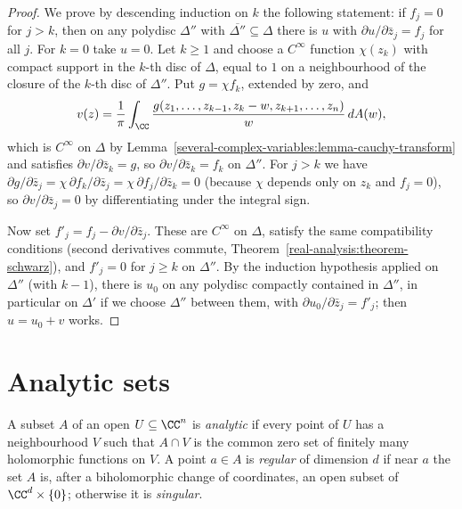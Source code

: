 \begin{proof}
We prove by descending induction on $k$ the following statement: if $f_j = 0$ for $j > k$, then on any polydisc $\Delta''$ with $\overline{\Delta''} \subseteq \Delta$ there is $u$ with
$\partial u/\partial\bar z_j = f_j$ for all $j$. For $k = 0$ take $u = 0$. Let $k \geq 1$ and choose a $C^\infty$ function $\chi(z_k)$ with compact support in the $k$-th disc of $\Delta$, equal to $1$ on a
neighbourhood of the closure of the $k$-th disc of $\Delta''$. Put $g = \chi f_k$, extended by zero, and
\[
v(z) = \frac1\pi\int_\CC\frac{g(z_1, \ldots, z_{k-1}, z_k - w, z_{k+1}, \ldots, z_n)}{w}\,dA(w),
\]
which is $C^\infty$ on $\Delta$ by Lemma~\ref{several-complex-variables:lemma-cauchy-transform} and satisfies $\partial v/\partial\bar z_k = g$, so $\partial v/\partial\bar z_k = f_k$ on $\Delta''$. For
$j > k$ we have $\partial g/\partial\bar z_j = \chi\,\partial f_k/\partial\bar z_j = \chi\,\partial f_j/\partial\bar z_k = 0$ (because $\chi$ depends only on $z_k$ and $f_j = 0$), so
$\partial v/\partial\bar z_j = 0$ by differentiating under the integral sign.

Now set $f'_j = f_j - \partial v/\partial\bar z_j$. These are $C^\infty$ on $\Delta$, satisfy the same compatibility conditions (second derivatives commute,
Theorem~\ref{real-analysis:theorem-schwarz}), and $f'_j = 0$ for $j \geq k$ on $\Delta''$. By the induction hypothesis applied on $\Delta''$ (with $k - 1$), there is $u_0$ on any polydisc compactly
contained in $\Delta''$, in particular on $\Delta'$ if we choose $\Delta''$ between them, with $\partial u_0/\partial\bar z_j = f'_j$; then $u = u_0 + v$ works.
\end{proof}

\section{Analytic sets}\label{several-complex-variables:section-analytic-sets}

\begin{definition}\label{several-complex-variables:definition-analytic-set}
A subset $A$ of an open $U \subseteq \CC^n$ is \emph{analytic} if every point of $U$ has a neighbourhood $V$ such that $A \cap V$ is the common zero set of finitely many holomorphic functions on $V$. A point
$a \in A$ is \emph{regular} of dimension $d$ if near $a$ the set $A$ is, after a biholomorphic change of coordinates, an open subset of $\CC^d \times \{0\}$; otherwise it is \emph{singular}.
\end{definition}

